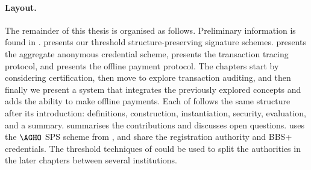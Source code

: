 \paragraph{Layout.} The remainder of this thesis is organised as follows.
Preliminary information is found in . 
presents our threshold structure-preserving signature schemes.
 presents the aggregate anonymous credential scheme,
 presents the transaction tracing protocol, and
 presents the offline payment protocol.  The
chapters start by considering certification, then move to explore transaction
auditing, and then finally we present a system that integrates the previously
explored concepts and adds the ability to make offline payments. Each of
 follows the same structure after
its introduction: definitions, construction, instantiation, security,
evaluation, and a summary.   summarises the contributions
and discusses open questions.
 uses the $\AGHO$ SPS scheme from , and
 share the registration authority and
BBS+ credentials. The threshold techniques of  could be used to
split the authorities in the later chapters between several institutions.
